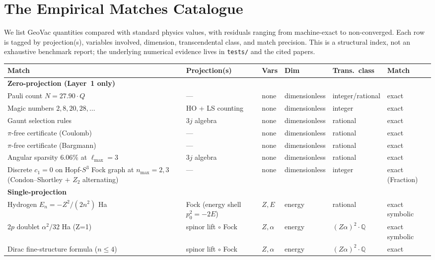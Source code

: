 \documentclass[11pt]{article}
\begin{document}
\section{The Empirical Matches Catalogue}
\label{sec:catalog}

We list GeoVac quantities compared with standard physics values,
with residuals ranging from machine-exact to non-converged.  Each row is tagged by
projection(s), variables involved, dimension, transcendental class,
and match precision.  This is a structural index, not an exhaustive
benchmark report; the underlying numerical evidence lives in
\texttt{tests/} and the cited papers.

\begin{longtable}{p{3.5cm} p{2.8cm} p{1.3cm} p{2.2cm} p{1.8cm} p{1.4cm}}
\toprule
Match & Projection(s) & Vars & Dim & Trans.\ class & Match \\
\midrule
\endhead
\textbf{Zero-projection (Layer~1 only)} & & & & & \\
Pauli count $N = 27.90{\cdot}Q$ & --- & none & dimensionless &
integer/rational & exact \\
Magic numbers $2,8,20,28,\ldots$ & HO + LS counting & none &
dimensionless & integer & exact \\
Gaunt selection rules & 3$j$ algebra & none & dimensionless &
rational & exact \\
$\pi$-free certificate (Coulomb) & --- & none & dimensionless &
rational & exact \\
$\pi$-free certificate (Bargmann) & --- & none & dimensionless &
rational & exact \\
Angular sparsity 6.06\% at $\ell_\text{max}=3$ & 3$j$ algebra &
none & dimensionless & rational & exact \\
Discrete $c_1 = 0$ on Hopf-$S^3$ Fock graph at $n_\text{max} = 2, 3$
(Condon--Shortley $+$ $Z_2$ alternating) & --- &
none & dimensionless & integer & exact (Fraction) \\
\midrule
\textbf{Single-projection} & & & & & \\
Hydrogen $E_n = -Z^2/(2n^2)$ Ha & Fock (energy shell $p_0^2 = -2E$) & $Z, E$ &
energy & rational & exact symbolic \\
2$p$ doublet $\alpha^2/32$ Ha (Z=1) & spinor lift $\circ$ Fock &
$Z, \alpha$ & energy & $(Z\alpha)^2{\cdot}\mathbb{Q}$ & exact symbolic \\
Dirac fine-structure formula ($n\le 4$) & spinor lift $\circ$ Fock &
$Z, \alpha$ & energy & $(Z\alpha)^2{\cdot}\mathbb{Q}$ & exact \\

\end{longtable}
\end{document}
